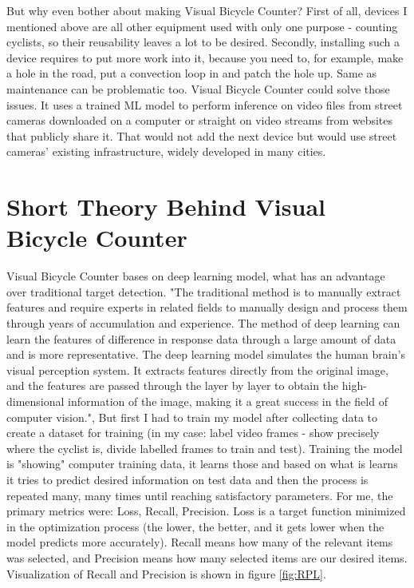 But why even bother about making Visual Bicycle Counter? First of all, devices I mentioned above are all other equipment used with only one purpose - counting cyclists, so their reusability leaves a lot to be desired. Secondly, installing such a device requires to put more work into it, because you need to, for example, make a hole in the road, put a convection loop in and patch the hole up. Same as maintenance can be problematic too. Visual Bicycle Counter could solve those issues. It uses a trained ML model to perform inference on video files from street cameras downloaded on a computer or straight on video streams from websites that publicly share it. That would not add the next device but would use street cameras' existing infrastructure, widely developed in many cities.



\section{Short Theory Behind Visual Bicycle Counter}
\label{sec:theory}

Visual Bicycle Counter bases on deep learning model\cite{deepLearning}, what has an advantage over traditional target detection. "The traditional method is to manually extract features and require experts in related fields to manually design and process them through years of accumulation and experience. The method of deep learning can learn the features of difference in response data through a large amount of data and is more representative. The deep learning model simulates the human brain's visual perception system. It extracts features directly from the original image, and the features are passed through the layer by layer to obtain the high-dimensional information of the image, making it a great success in the field of computer vision."\cite{deepLearning}, But first I had to train my model after collecting data to create a dataset for training (in my case: label video frames - show precisely where the cyclist is, divide labelled frames to train and test). Training the model is "showing" computer training data, it learns those and based on what is learns it tries to predict desired information on test data and then the process is repeated many, many times until reaching satisfactory parameters. For me, the primary metrics were: Loss, Recall, Precision. Loss is a target function minimized in the optimization process (the lower, the better, and it gets lower when the model predicts more accurately). Recall means how many of the relevant items was selected, and Precision means how many selected items are our desired items. Visualization of Recall and Precision is shown in figure \ref{fig:RPL}.

